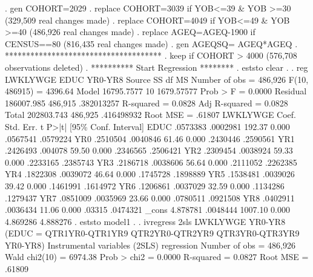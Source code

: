 . gen COHORT=2029
{\smallskip}
. replace COHORT=3039 if YOB<=39 \& YOB >=30
(329,509 real changes made)
{\smallskip}
. replace COHORT=4049 if YOB<=49 \& YOB >=40
(486,926 real changes made)
{\smallskip}
. replace AGEQ=AGEQ-1900 if CENSUS==80
(816,435 real changes made)
{\smallskip}
. gen AGEQSQ= AGEQ*AGEQ
{\smallskip}
. *************************************
. keep if COHORT > 4000
(576,708 observations deleted)
{\smallskip}
. **********  Start Regression ********
. eststo clear
{\smallskip}
. 
. reg  LWKLYWGE EDUC  YR0-YR8 
{\smallskip}
      Source {\VBAR}       SS           df       MS      Number of obs   =   486,926
   F(10, 486915)   =   4396.64
       Model {\VBAR}  16795.7577        10  1679.57577   Prob > F        =    0.0000
    Residual {\VBAR}  186007.985   486,915  .382013257   R-squared       =    0.0828
   Adj R-squared   =    0.0828
       Total {\VBAR}  202803.743   486,925  .416498932   Root MSE        =    .61807
{\smallskip}
    LWKLYWGE {\VBAR}      Coef.   Std. Err.      t    P>|t|     [95\% Conf. Interval]
        EDUC {\VBAR}   .0573383   .0002981   192.37   0.000     .0567541    .0579224
         YR0 {\VBAR}   .2510504   .0040846    61.46   0.000     .2430446    .2590561
         YR1 {\VBAR}   .2426493    .004078    59.50   0.000     .2346565    .2506421
         YR2 {\VBAR}   .2309454   .0038924    59.33   0.000     .2233165    .2385743
         YR3 {\VBAR}   .2186718   .0038606    56.64   0.000     .2111052    .2262385
         YR4 {\VBAR}   .1822308   .0039072    46.64   0.000     .1745728    .1898889
         YR5 {\VBAR}   .1538481   .0039026    39.42   0.000     .1461991    .1614972
         YR6 {\VBAR}   .1206861   .0037029    32.59   0.000     .1134286    .1279437
         YR7 {\VBAR}   .0851009   .0035969    23.66   0.000     .0780511    .0921508
         YR8 {\VBAR}   .0402911   .0036434    11.06   0.000       .03315    .0474321
       _cons {\VBAR}   4.878781   .0048444  1007.10   0.000     4.869286    4.888276
{\smallskip}
. eststo model1
{\smallskip}
. 
. ivregress 2sls LWKLYWGE YR0-YR8 (EDUC = QTR1YR0-QTR1YR9 QTR2YR0-QTR2YR9 QTR3YR0-QTR3YR9 YR0-YR8)
{\smallskip}
Instrumental variables (2SLS) regression          Number of obs   =    486,926
                                                  Wald chi2(10)   =    6974.38
                                                  Prob > chi2     =     0.0000
                                                  R-squared       =     0.0827
                                                  Root MSE        =     .61809
